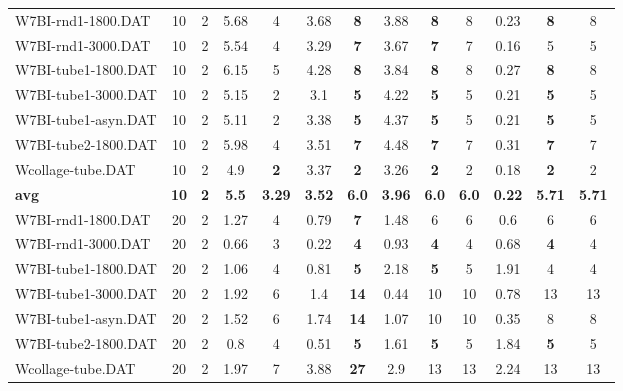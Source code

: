 \begin{table}[h]
{\begin{tabular}{lcccccccccccc}
W7BI-rnd1-1800.DAT & 10 & 2 & 5.68 & 4 & 3.68 &  \textbf{8} & 3.88 &  \textbf{8} & 8 &  \textcolor{blue2}{0.23} &  \textbf{8} & 8 \\
W7BI-rnd1-3000.DAT & 10 & 2 & 5.54 & 4 & 3.29 &  \textbf{7} & 3.67 &  \textbf{7} & 7 &  \textcolor{blue2}{0.16} & 5 & 5 \\
W7BI-tube1-1800.DAT & 10 & 2 & 6.15 & 5 & 4.28 &  \textbf{8} & 3.84 &  \textbf{8} & 8 &  \textcolor{blue2}{0.27} &  \textbf{8} & 8 \\
W7BI-tube1-3000.DAT & 10 & 2 & 5.15 & 2 & 3.1 &  \textbf{5} & 4.22 &  \textbf{5} & 5 &  \textcolor{blue2}{0.21} &  \textbf{5} & 5 \\
W7BI-tube1-asyn.DAT & 10 & 2 & 5.11 & 2 & 3.38 &  \textbf{5} & 4.37 &  \textbf{5} & 5 &  \textcolor{blue2}{0.21} &  \textbf{5} & 5 \\
W7BI-tube2-1800.DAT & 10 & 2 & 5.98 & 4 & 3.51 &  \textbf{7} & 4.48 &  \textbf{7} & 7 &  \textcolor{blue2}{0.31} &  \textbf{7} & 7 \\
Wcollage-tube.DAT & 10 & 2 & 4.9 &  \textbf{2} & 3.37 &  \textbf{2} & 3.26 &  \textbf{2} & 2 &  \textcolor{blue2}{0.18} &  \textbf{2} & 2 \\
\cline{1-13} \textbf{avg} & \textbf{10} & \textbf{2} & \textbf{5.5} & \textbf{3.29} & \textbf{3.52} & \textbf{6.0} & \textbf{3.96} & \textbf{6.0} & \textbf{6.0} & \textbf{0.22} & \textbf{5.71} & \textbf{5.71} \\ \cline{1-13}
W7BI-rnd1-1800.DAT & 20 & 2 & 1.27 & 4 & 0.79 &  \textbf{7} & 1.48 & 6 & 6 &  \textcolor{blue2}{0.6} & 6 & 6 \\
W7BI-rnd1-3000.DAT & 20 & 2 & 0.66 & 3 &  \textcolor{blue2}{0.22} &  \textbf{4} & 0.93 &  \textbf{4} & 4 & 0.68 &  \textbf{4} & 4 \\
W7BI-tube1-1800.DAT & 20 & 2 & 1.06 & 4 &  \textcolor{blue2}{0.81} &  \textbf{5} & 2.18 &  \textbf{5} & 5 & 1.91 & 4 & 4 \\
W7BI-tube1-3000.DAT & 20 & 2 & 1.92 & 6 & 1.4 &  \textbf{14} &  \textcolor{blue2}{0.44} & 10 & 10 & 0.78 & 13 & 13 \\
W7BI-tube1-asyn.DAT & 20 & 2 & 1.52 & 6 & 1.74 &  \textbf{14} & 1.07 & 10 & 10 &  \textcolor{blue2}{0.35} & 8 & 8 \\
W7BI-tube2-1800.DAT & 20 & 2 & 0.8 & 4 &  \textcolor{blue2}{0.51} &  \textbf{5} & 1.61 &  \textbf{5} & 5 & 1.84 &  \textbf{5} & 5 \\
Wcollage-tube.DAT & 20 & 2 &  \textcolor{blue2}{1.97} & 7 & 3.88 &  \textbf{27} & 2.9 & 13 & 13 & 2.24 & 13 & 13 \\

\end{tabular}}
\end{table}
